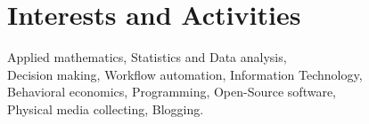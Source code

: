 \documentclass[a4paper,10pt]{article} %
\begin{document}

\section{Interests and Activities}

Applied mathematics, Statistics and Data analysis,\\
Decision making, Workflow automation, Information Technology,\\
Behavioral economics, Programming, Open-Source software,\\
Physical media collecting, Blogging.
\end{document}
